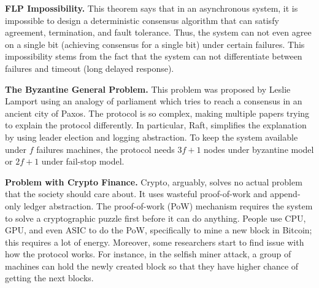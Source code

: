 \documentclass[twoside]{article}
\begin{document}
\textbf{FLP Impossibility.} This theorem says that in an asynchronous system, it is impossible to design a deterministic consensus algorithm that can satisfy agreement, termination, and fault tolerance. 
Thus, the system can not even agree on a single bit (achieving consensus for a single bit) under certain failures.
This impossibility stems from the fact that the system can not differentiate between failures and timeout (long delayed response).


\textbf{The Byzantine General Problem. } This problem was proposed by Leslie Lamport using an analogy of parliament which tries to reach a consensus in an ancient city of Paxos. 
The protocol is so complex, making multiple papers trying to explain the protocol differently. 
In particular, Raft, simplifies the explanation by using leader election and logging abstraction. To keep the system available under $f$ failures machines, the protocol needs $3f+1$ nodes under byzantine model or $2f+1$ under fail-stop model.

\textbf{Problem with Crypto Finance.} Crypto, arguably, solves no actual problem that the society should care about. It uses wasteful proof-of-work and append-only ledger abstraction. The proof-of-work (PoW) mechanism requires the system to solve a cryptographic puzzle first before it can do anything. People use CPU, GPU, and even ASIC to do the PoW, specifically to mine a new block in Bitcoin; this requires a lot of energy. Moreover, some researchers start to find issue with how the protocol works. For instance, in the selfish miner attack, a group of machines can hold the newly created block so that they have higher chance of getting the next blocks.
\end{document}
